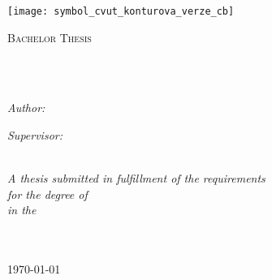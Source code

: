 \documentclass[
11pt, %
english, %
singlespacing, %
headsepline, %
]{MastersDoctoralThesis} %
\author{Jakub \textsc{Lečbych}} %
\begin{document}
\frontmatter %

\pagestyle{plain} %


\begin{titlepage}
\begin{center}

\vspace*{.0\textheight}
{\scshape\LARGE \univname\par}\vspace{1cm} %

\texttt{[image: symbol\_cvut\_konturova\_verze\_cb]}\vspace{1cm} %

\textsc{\Large Bachelor Thesis}\\[0.5cm] %

\HRule \\[0.4cm] %
{\huge \bfseries \ttitle\par}\vspace{0.4cm} %
\HRule \\[1.5cm] %
 
\begin{minipage}[t]{0.4\textwidth}
\begin{flushleft} \large
\emph{Author:}\\
\authorname %
\end{flushleft}
\end{minipage}
\begin{minipage}[t]{0.4\textwidth}
\begin{flushright} \large
\emph{Supervisor:} \\
\supname %
\end{flushright}
\end{minipage}\\[3cm]
 
\large \textit{A thesis submitted in fulfillment of the requirements\\ for the degree of \degreename}\\[0.3cm] %
\textit{in the}\\[0.4cm]
\groupname\\\deptname\\[2cm] %
 
\vfill

{\large \today}\\[4cm] %
 
\vfill
\end{center}
\end{titlepage}
\end{document}
